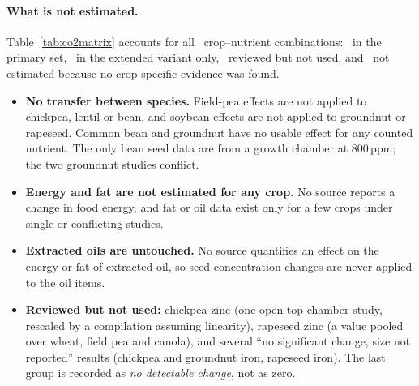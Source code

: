 \begin{table}[H]\centering\scriptsize
\caption[CO$_2$ effects applied]{Elevated-CO$_2$ effects on the concentration in the edible part, as published. Primary
set: Extended Data Table~1 of \citet{myers2014}. The lentil values are derived from table means in the author's thesis
(wet and dry season are separate treatments, not a confidence interval); the published paper was read at abstract level.
Signif.: significance as reported.}\label{tab:co2params}
\end{table}

\paragraph{What is not estimated.} Table~\ref{tab:co2matrix} accounts for all \cotwoCellsTotal\ crop--nutrient
combinations: \cotwoCellsPrimary\ in the primary set, \cotwoCellsExt\ in the extended variant only, \cotwoCellsRev\ reviewed
but not used, and \cotwoCellsNE\ not estimated because no crop-specific evidence was found.
\begin{itemize}
\item \textbf{No transfer between species.} Field-pea effects are not applied to chickpea, lentil or bean, and soybean
effects are not applied to groundnut or rapeseed. Common bean and groundnut have no usable effect for any counted
nutrient. The only bean seed data are from a growth chamber at 800\,ppm; the two groundnut studies conflict.
\item \textbf{Energy and fat are not estimated for any crop.} No source reports a change in food energy, and fat or oil
data exist only for a few crops under single or conflicting studies.
\item \textbf{Extracted oils are untouched.} No source quantifies an effect on the energy or fat of extracted oil, so
seed concentration changes are never applied to the oil items.
\item \textbf{Reviewed but not used:} chickpea zinc (one open-top-chamber study, rescaled by a compilation assuming
linearity), rapeseed zinc (a value pooled over wheat, field pea and canola), and several ``no significant change, size
not reported'' results (chickpea and groundnut iron, rapeseed iron). The last group is recorded as \emph{no
detectable change}, not as zero.
\end{itemize}

\begin{table}[H]\centering\small
\caption[CO$_2$ evidence coverage]{Evidence for CO$_2$ effects on concentration. \textbf{S}: significant effect in the
primary set; \textbf{n.s.}: nonsignificant estimate in the primary set (applied with its interval); ext.: extended
variant only; rev.: evidence reviewed but not used; n/e: not estimated (no crop-specific evidence).}\label{tab:co2matrix}
\end{table}

